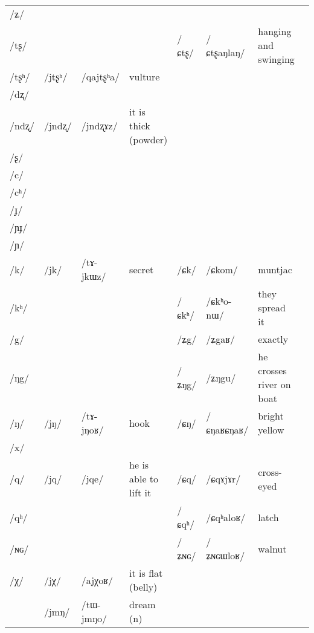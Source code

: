 \documentclass[oldfontcommands,oneside,a4paper,11pt]{article}
\newcommand{\ipa}[1]{{\phon/#1/}} %
\newcommand{\deux}[1]{/#1/}
\newcommand{\trois}[1]{/#1/}
\newcommand{\idph}[1]{\cellcolor{gray}\textbf{#1}}
\begin{document}
\begin{table}
{\begin{tabular}{l|lll|lll|l}
\ipa{ʑ}  & 	  & 	  & 	  & 	  & 	  & 	  & 	\\
\ipa{tʂ}  & 	  & 	  & 	  & 	 \deux{ɕtʂ} \idph{}  & 	 \ipa{ɕtʂaŋlaŋ}  & 	 hanging and swinging & 	\\
\ipa{tʂʰ}  & 	 \deux{jtʂʰ}  & 	 \ipa{qajtʂʰa}  & 	vulture  & 	  & 	  & 	  & 	\\
\ipa{dʐ}  & 	  & 	  & 	  & 	  & 	  & 	  & 	\\
\ipa{ndʐ}  & 	 \deux{jndʐ}  & 	 \ipa{jndʐɤz}  & 	it is thick (powder)  & 	  & 	  & 	  & 	\\
\ipa{ʂ}  & 	  & 	  & 	  & 	  & 	  & 	  & 	\\
\ipa{c}  & 	  & 	  & 	  & 	  & 	  & 	  & 	\\
\ipa{cʰ}  & 	  & 	  & 	  & 	  & 	  & 	  & 	\\
\ipa{ɟ}  & 	  & 	  & 	  & 	  & 	  & 	  & 	\\
\ipa{ɲɟ}  & 	  & 	  & 	  & 	  & 	  & 	  & 	\\
\ipa{ɲ}  & 	  & 	  & 	  & 	  & 	  & 	  & 	\\
\ipa{k}  &	 \deux{jk}  &	 \ipa{tɤ-jkɯz}  &	 secret  &	 \deux{ɕk}  &	 \ipa{ɕkom}  &	 muntjac  &	\\
\ipa{kʰ}  &	  &	  &	  &	 \deux{ɕkʰ}  &	 \ipa{ɕkʰo-nɯ}  &	 they spread it  &	\\
\ipa{g}  &	  &	  &	  &	 \deux{ʑg}  &	 \ipa{ʑgaʁ}  &	 exactly  &	\\
\ipa{ŋg}  &	  &	  &	  &	 \deux{ʑŋg}  &	 \ipa{ʑŋgu}  &	 he crosses river on boat  &	\\
\ipa{ŋ}  &	 \deux{jŋ}  &	 \ipa{tɤ-jŋoʁ}  &	 hook  &	 \deux{ɕŋ} \idph{}  &	 \ipa{ɕŋaʁɕŋaʁ}  &	 bright yellow  &	\\
\ipa{x}  &	  &	  &	  &	  &	  &	  &	\\
\ipa{q}  &	 \deux{jq}  &	 \ipa{jqe}  &	 he is able to lift it  &	 \deux{ɕq}  &	 \ipa{ɕqɤjɤr}  &	 cross-eyed  &	\\
\ipa{qʰ}  &	  &	  &	  &	 \deux{ɕqʰ}  &	 \ipa{ɕqʰaloʁ}  &	 latch  &	\\
\ipa{ɴɢ}  &	  &	  &	  &	 \deux{ʑɴɢ}  &	 \ipa{ʑɴɢɯloʁ}  &	 walnut  &	\\
\ipa{χ}  &	 \deux{jχ}  &	 \ipa{ajχoʁ}  &	 it is flat (belly)  &	  &	  &	  &	\\
\midrule  					 
 &\trois{jmŋ} & \ipa{tɯ-jmŋo} &dream (n) \\  
  \end{tabular}}
\end{table}
  
\end{document}
